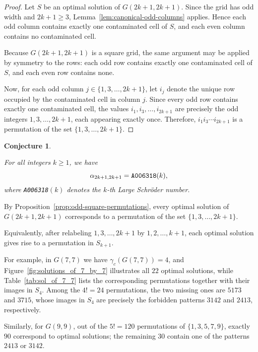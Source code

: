 \documentclass[letterpaper,12pt]{article}
\newtheorem{conjecture}{Conjecture}
\begin{document}
\begin{proof}
Let $S$ be an optimal solution of $G(2k+1,2k+1)$. Since the grid has odd width and $2k+1\ge 3$, Lemma~\ref{lem:canonical-odd-columns} applies. Hence each odd column
contains exactly one contaminated cell of $S$, and each even column contains no contaminated
cell.

Because $G(2k+1,2k+1)$ is a square grid, the same argument may be applied by symmetry to
the rows: each odd row contains exactly one contaminated cell of $S$, and each even row
contains none.

Now, for each odd column $j\in\{1,3,\dots,2k+1\}$, let $i_j$ denote the unique row occupied
by the contaminated cell in column $j$. Since every odd row contains exactly one contaminated
cell, the values $i_1,i_3,\dots,i_{2k+1}$ are precisely the odd integers $1,3,\dots,2k+1$,  each appearing exactly once. Therefore, $i_1 i_3 \cdots i_{2k+1}$ is a permutation of the set $\{1,3,\dots,2k+1\}$.\qedhere
\end{proof}

  

\begin{conjecture}\label{conj:schroder}
    
For all integers $k \geq 1$, we have
\begin{equation}
    \alpha_{2k+1, 2k+1} = \textup{\texttt{A006318}}(k),
\end{equation}
where \textup{\texttt{A006318}}$(k)$ denotes the $k$-th \emph{Large Schröder number}.
\end{conjecture}


By Proposition~\ref{prop:odd-square-permutations}, every optimal solution of $G(2k+1,2k+1)$
corresponds to a permutation of the set $\{1,3,\dots,2k+1\}$.
 
Equivalently, after relabeling $1,3,\dots,2k+1$ by $1,2,\dots,k+1$, each optimal solution gives
rise to a permutation in $S_{k+1}$.

For example, in $G(7,7)$ we have $\gamma_c(G(7,7))=4$, and Figure~\ref{fig:solutions_of_7_by_7} illustrates all $22$
optimal solutions, while Table~\ref{tab:sol_of_7_7} lists the corresponding permutations together with their images
in $S_4$. Among the $4!=24$ permutations, the two missing ones are $5173$ and $3715$, whose
images in $S_4$ are precisely the forbidden patterns $3142$ and $2413$, respectively.

Similarly, for $G(9,9)$, out of the $5!=120$ permutations of $\{1,3,5,7,9\}$, exactly $90$
correspond to optimal solutions; the remaining $30$ contain one of the patterns $2413$ or $3142$.
\end{document}
